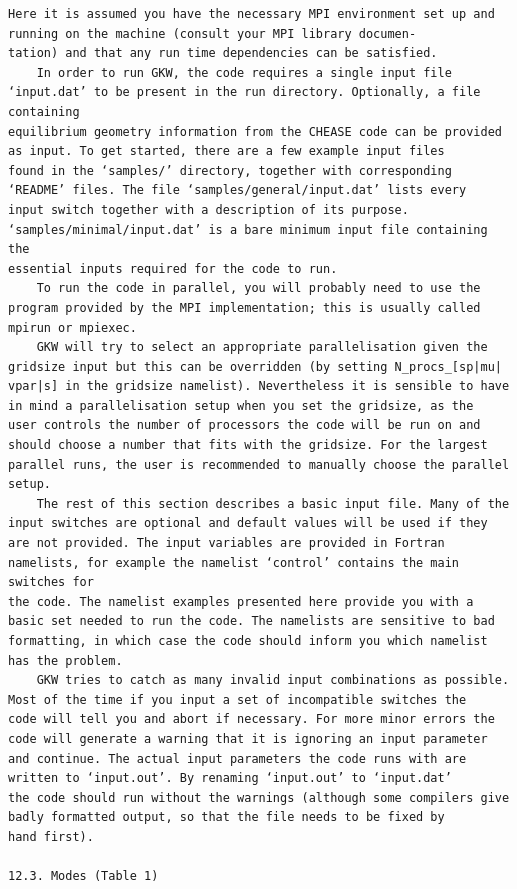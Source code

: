 \documentclass[a4paper]{article}
\newcommand{\gkwpagefont}{\fontsize{6.0pt}{7.55pt}\selectfont}
\begin{document}
\begin{Verbatim}[fontsize=\gkwpagefont]
    Here it is assumed you have the necessary MPI environment set up and running on the machine (consult your MPI library documen-
tation) and that any run time dependencies can be satisfied.
    In order to run GKW, the code requires a single input file ‘input.dat’ to be present in the run directory. Optionally, a file containing
equilibrium geometry information from the CHEASE code can be provided as input. To get started, there are a few example input files
found in the ‘samples/’ directory, together with corresponding ‘README’ files. The file ‘samples/general/input.dat’ lists every
input switch together with a description of its purpose. ‘samples/minimal/input.dat’ is a bare minimum input file containing the
essential inputs required for the code to run.
    To run the code in parallel, you will probably need to use the program provided by the MPI implementation; this is usually called
mpirun or mpiexec.
    GKW will try to select an appropriate parallelisation given the gridsize input but this can be overridden (by setting N_procs_[sp|mu|
vpar|s] in the gridsize namelist). Nevertheless it is sensible to have in mind a parallelisation setup when you set the gridsize, as the
user controls the number of processors the code will be run on and should choose a number that fits with the gridsize. For the largest
parallel runs, the user is recommended to manually choose the parallel setup.
    The rest of this section describes a basic input file. Many of the input switches are optional and default values will be used if they
are not provided. The input variables are provided in Fortran namelists, for example the namelist ‘control’ contains the main switches for
the code. The namelist examples presented here provide you with a basic set needed to run the code. The namelists are sensitive to bad
formatting, in which case the code should inform you which namelist has the problem.
    GKW tries to catch as many invalid input combinations as possible. Most of the time if you input a set of incompatible switches the
code will tell you and abort if necessary. For more minor errors the code will generate a warning that it is ignoring an input parameter
and continue. The actual input parameters the code runs with are written to ‘input.out’. By renaming ‘input.out’ to ‘input.dat’
the code should run without the warnings (although some compilers give badly formatted output, so that the file needs to be fixed by
hand first).

12.3. Modes (Table 1)


\end{Verbatim}
\end{document}
